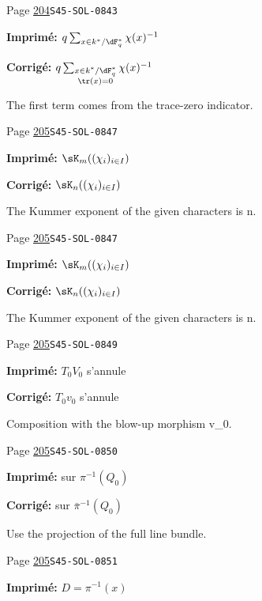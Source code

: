 \begin{description}
\smallskip
\item[\hypertarget{apparatus:FR-0193}{193}] Page \hyperlink{printpage:fr:204}{204}\quad\texttt{S45-SOL-0843}
\par\noindent\textbf{Imprimé:} \(q\sum_{x\in k^\ast/\dF_q^\ast} \chi(x)^{-1}\)
\par\noindent\textbf{Corrigé:} \(q\sum_{\substack{x\in k^\ast/\dF_q^\ast\\\tr(x)=0}} \chi(x)^{-1}\)
\par\noindent The first term comes from the trace-zero indicator.
\smallskip
\item[\hypertarget{apparatus:FR-0194}{194}] Page \hyperlink{printpage:fr:205}{205}\quad\texttt{S45-SOL-0847}
\par\noindent\textbf{Imprimé:} \(\sK_m((\chi_i)_{i\in I})\)
\par\noindent\textbf{Corrigé:} \(\sK_n((\chi_i)_{i\in I})\)
\par\noindent The Kummer exponent of the given characters is n.
\smallskip
\item[\hypertarget{apparatus:FR-0195}{195}] Page \hyperlink{printpage:fr:205}{205}\quad\texttt{S45-SOL-0847}
\par\noindent\textbf{Imprimé:} \(\sK_m((\chi_i)_{i\in I})\)
\par\noindent\textbf{Corrigé:} \(\sK_n((\chi_i)_{i\in I})\)
\par\noindent The Kummer exponent of the given characters is n.
\smallskip
\item[\hypertarget{apparatus:FR-0196}{196}] Page \hyperlink{printpage:fr:205}{205}\quad\texttt{S45-SOL-0849}
\par\noindent\textbf{Imprimé:} $T_0 V_0$ s'annule
\par\noindent\textbf{Corrigé:} $T_0 v_0$ s'annule
\par\noindent Composition with the blow-up morphism v\_0.
\smallskip
\item[\hypertarget{apparatus:FR-0197}{197}] Page \hyperlink{printpage:fr:205}{205}\quad\texttt{S45-SOL-0850}
\par\noindent\textbf{Imprimé:} sur $\pi^{-1}(Q_0)$
\par\noindent\textbf{Corrigé:} sur $\bar\pi^{-1}(Q_0)$
\par\noindent Use the projection of the full line bundle.
\smallskip
\item[\hypertarget{apparatus:FR-0198}{198}] Page \hyperlink{printpage:fr:205}{205}\quad\texttt{S45-SOL-0851}
\par\noindent\textbf{Imprimé:} $D=\pi^{-1}(x)$

\end{description}
